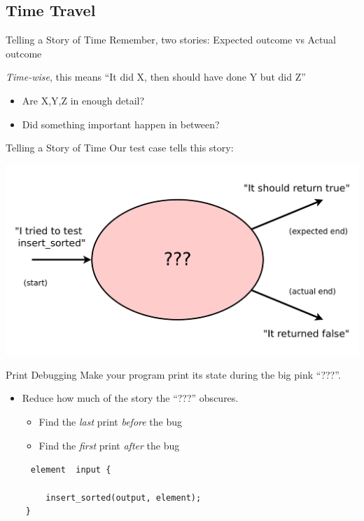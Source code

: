 \documentclass[xcolor=dvipsnames]{beamer}
\begin{document}
\subsection{Time Travel}


\begin{frame}{Telling a Story of Time}
	Remember, two stories: Expected outcome vs Actual outcome

	\linegap
	{\em Time-wise}, this means ``It did X, then should have done Y but did Z''
	\begin{itemize}
		\item Are X,Y,Z in enough detail?
		\item Did something important happen in between?
	\end{itemize}
\end{frame}

\begin{frame}{Telling a Story of Time}
	Our test case tells this story:

	\linegap
	\includegraphics[width=\textwidth]{time0.png}
\end{frame}

\begin{frame}{Print Debugging}
	Make your program print its state during the big pink ``???''.
	\begin{itemize}
		\item Reduce how much of the story the ``???'' obscures.
		\begin{itemize}
			\item Find the {\em last} print {\em before} the bug
			\item Find the {\em first} print {\em after} the bug
		\end{itemize}
	\end{itemize}
	\pause

	\linegap
		\texttt{~~~~~element~~input~\{} \\
		\texttt{~~~~~~~~} \\
		\texttt{~~~~~~~~insert\_sorted(output,~element);} \\
		\texttt{~~~~\}} \\
\end{frame}
\end{document}
